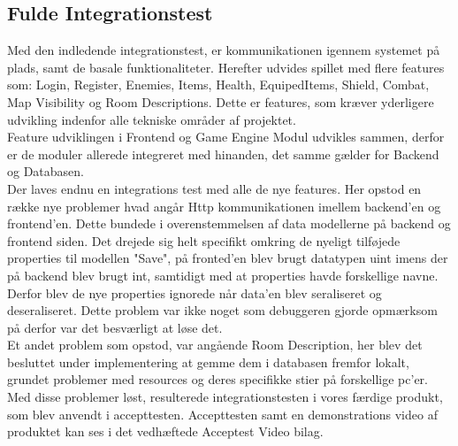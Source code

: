 
\subsection{Fulde Integrationstest}

Med den indledende integrationstest, er kommunikationen igennem systemet på plads, samt de basale funktionaliteter. Herefter udvides spillet med flere features som: Login, Register, Enemies, Items, Health, EquipedItems, Shield, Combat, Map Visibility og Room Descriptions. Dette er features, som kræver yderligere udvikling indenfor alle tekniske områder af projektet.\\

\noindent Feature udviklingen i Frontend og Game Engine Modul udvikles sammen, derfor er de moduler allerede integreret med hinanden, det samme gælder for Backend og Databasen.\\

\noindent Der laves endnu en integrations test med alle de nye features. Her opstod en række nye problemer hvad angår Http kommunikationen imellem backend'en og frontend'en. Dette bundede i overenstemmelsen af data modellerne på backend og frontend siden. Det drejede sig helt specifikt omkring de nyeligt tilføjede properties til modellen "Save", på fronted'en blev brugt datatypen uint imens der på backend blev brugt int, samtidigt med at properties havde forskellige navne. Derfor blev de nye properties ignorede når data'en blev seraliseret og deseraliseret. Dette problem var ikke noget som debuggeren gjorde opmærksom på derfor var det besværligt at løse det.\\

\noindent Et andet problem som opstod, var angående Room Description, her blev det besluttet under implementering at gemme dem i databasen fremfor lokalt, grundet problemer med resources og deres specifikke stier på forskellige pc'er.\\

\noindent Med disse problemer løst, resulterede integrationstesten i vores færdige produkt, som blev anvendt i accepttesten. Accepttesten samt en demonstrations video af produktet kan ses i det vedhæftede Acceptest Video bilag.   
 

  

